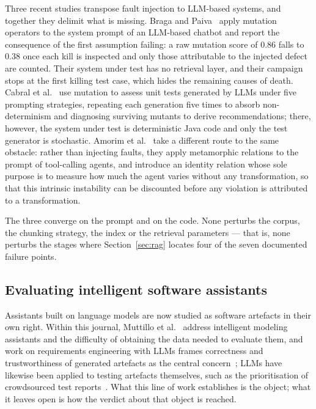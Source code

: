 \documentclass[a4paper,fleqn]{cas-dc}
\begin{document}
Three recent studies transpose fault injection to LLM-based systems, and
together they delimit what is missing. Braga and Paiva~\cite{braga2026mutation}
apply mutation operators to the system prompt of an LLM-based chatbot and
report the consequence of the first assumption failing: a raw mutation score of
0.86 falls to 0.38 once each kill is inspected and only those attributable to
the injected defect are counted. Their system under test has no retrieval layer,
and their campaign stops at the first killing test case, which hides the
remaining causes of death. Cabral et al.~\cite{cabral2026prompt} use mutation to
assess unit tests generated by LLMs under five prompting strategies, repeating
each generation five times to absorb non-determinism and diagnosing surviving
mutants to derive recommendations; there, however, the system under test is
deterministic Java code and only the test generator is stochastic. Amorim et
al.~\cite{amorim2026trigger} take a different route to the same obstacle:
rather than injecting faults, they apply metamorphic relations to the prompt of
tool-calling agents, and introduce an identity relation whose sole purpose is
to measure how much the agent varies without any transformation, so that this
intrinsic instability can be discounted before any violation is attributed to
a transformation.

The three converge on the prompt and on the code. None perturbs the corpus, the
chunking strategy, the index or the retrieval parameters --- that is, none
perturbs the stages where Section~\ref{sec:rag} locates four of the seven
documented failure points.

\subsection{Evaluating intelligent software assistants}
\label{sec:assistants}

Assistants built on language models are now studied as software artefacts in
their own right. Within this journal, Muttillo et al.~\cite{muttillo2025modeling}
address intelligent modeling assistants and the difficulty of obtaining the
data needed to evaluate them, and work on requirements engineering with LLMs
frames correctness and trustworthiness of generated artefacts as the central
concern~\cite{infsof2025reroadmap}; LLMs have likewise been applied to testing
artefacts themselves, such as the prioritisation of crowdsourced test
reports~\cite{ling2025crowdsourced}. What this line of work establishes is the
object; what it leaves open is how the verdict about that object is reached.
\end{document}
